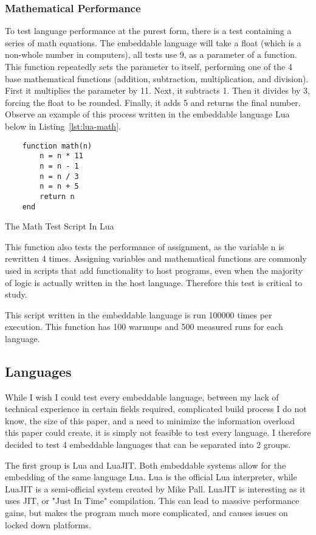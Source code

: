 \subsubsection{Mathematical Performance}
To test language performance at the purest form, there is a test containing a series of math equations. The embeddable language will take a float (which is a non-whole number in computers), all tests use 9, as a parameter of a function. This function repeatedly sets the parameter to itself, performing one of the 4 base mathematical functions (addition, subtraction, multiplication, and division). First it multiplies the parameter by 11. Next, it subtracts 1. Then it divides by 3, forcing the float to be rounded. Finally, it adds 5 and returns the final number. Observe an example of this process written in the embeddable language Lua below in Listing~\ref{lst:lua-math}.

\begin{listing}[H]
    \begin{verbatim}
    function math(n)
        n = n * 11
        n = n - 1
        n = n / 3
        n = n + 5
        return n
    end
    \end{verbatim}
    \caption{The Math Test Script In Lua}
    \label{lst:lua-math}
\end{listing}

This function also tests the performance of assignment, as the variable n is rewritten 4 times. Assigning variables and mathematical functions are commonly used in scripts that add functionality to host programs, even when the majority of logic is actually written in the host language. Therefore this test is critical to study.

This script written in the embeddable language is run 100000 times per execution. This function has 100 warmups and 500 measured runs for each language.

\subsection{Languages}
While I wish I could test every embeddable language, between my lack of technical experience in certain fields required, complicated build process I do not know, the size of this paper, and a need to minimize the information overload this paper could create, it is simply not feasible to test every language. I therefore decided to test 4 embeddable languages that can be separated into 2 groups.

The first group is Lua\cite{lua} and LuaJIT\cite{luaJIT}. Both embeddable systems allow for the embedding of the same language Lua. Lua is the official Lua interpreter, while LuaJIT is a semi-official system created by Mike Pall. LuaJIT is interesting as it uses JIT, or "Just In Time" compilation. This can lead to massive performance gains, but makes the program much more complicated, and causes issues on locked down platforms.

